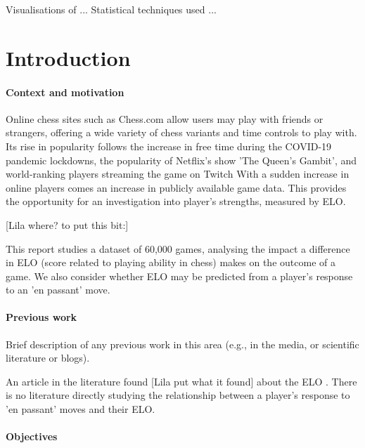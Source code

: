 \documentclass[10pt,a4paper,twocolumn]{article}
\begin{document}
Visualisations of ...
Statistical techniques used ...

\section{Introduction}

\paragraph{Context and motivation}

Online chess sites such as Chess.com allow users may play with friends or strangers, offering a wide variety of chess variants and time controls to play with. Its rise in popularity follows the increase in free time during the COVID-19 pandemic lockdowns, the popularity of Netflix's show 'The Queen's Gambit', and world-ranking players streaming the game on Twitch \cite{The2020ChessBoom} With a sudden increase in online players comes an increase in publicly available game data. This provides the opportunity for an investigation into player's strengths, measured by ELO.

[Lila where? to put this bit:]

This report studies a dataset of 60,000 games, analysing the impact a difference in ELO (score related to playing ability in chess) makes on the outcome of a game. We also consider whether ELO may be predicted from a player's response to an 'en passant' move.

\paragraph{Previous work}

Brief description of any previous work in this area (e.g., in the
media, or scientific literature or blogs).

An article in the literature found [Lila put what it found] about the ELO \cite{HowMuchDoesEloMatter}.
There is no literature directly studying the relationship between a player's response to 'en passant' moves and their ELO.
\paragraph{Objectives}
\end{document}

